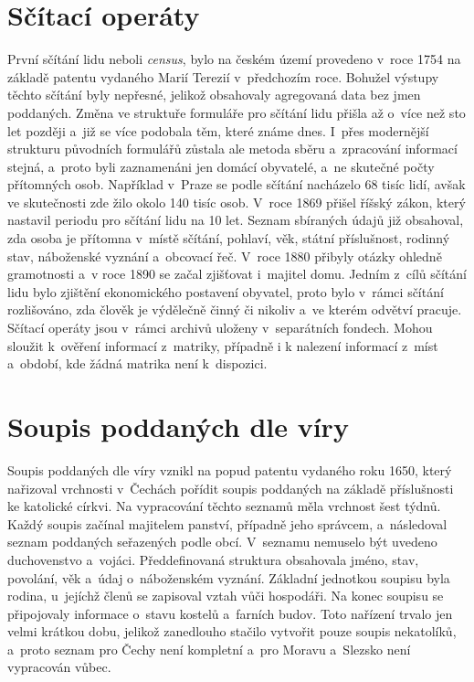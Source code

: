 \section{Sčítací operáty}
První sčítání lidu \cite{SestavteSiRodokmen, scitaciOperaty} neboli \textit{census}, bylo na českém území provedeno v~roce 1754 na základě patentu vydaného Marií Terezií v~předchozím roce. Bohužel výstupy těchto sčítání byly nepřesné, jelikož obsahovaly agregovaná data bez jmen poddaných. Změna ve struktuře formuláře pro sčítání lidu přišla až o~více než sto let později a~již se více podobala těm, které známe dnes. I~přes modernější strukturu původních formulářů zůstala ale metoda sběru a~zpracování informací stejná, a~proto byli zaznamenáni jen domácí obyvatelé, a~ne skutečné počty přítomných osob. Například v~Praze se podle sčítání nacházelo 68 tisíc lidí, avšak ve skutečnosti zde žilo okolo 140 tisíc osob. V~roce 1869 přišel říšský zákon, který nastavil periodu pro sčítání lidu na 10 let. Seznam sbíraných údajů již obsahoval, zda osoba je přítomna v~místě sčítání, pohlaví, věk, státní příslušnost, rodinný stav, náboženské vyznání a~obcovací řeč. V~roce 1880 přibyly otázky ohledně gramotnosti a~v roce 1890 se začal zjišťovat i~majitel domu. Jedním z~cílů sčítání lidu bylo zjištění ekonomického postavení obyvatel, proto bylo v~rámci sčítání rozlišováno, zda člověk je výdělečně činný či nikoliv a~ve kterém odvětví pracuje. Sčítací operáty jsou v~rámci archivů uloženy v~separátních fondech. Mohou sloužit k~ověření informací z~matriky, případně i k nalezení informací z~míst a~období, kde žádná matrika není k~dispozici.


\section{Soupis poddaných dle víry}
Soupis poddaných dle víry \cite{SoupisPoddanychDleViry} vznikl na popud patentu vydaného roku 1650, který nařizoval vrchnosti v~Čechách pořídit soupis poddaných na základě příslušnosti ke katolické církvi. Na vypracování těchto seznamů měla vrchnost šest týdnů. Každý soupis začínal majitelem panství, případně jeho správcem, a~následoval seznam poddaných seřazených podle obcí. V~seznamu nemuselo být uvedeno duchovenstvo a~vojáci. Předdefinovaná struktura obsahovala jméno, stav, povolání, věk a~údaj o~náboženském vyznání. Základní jednotkou soupisu byla rodina, u~jejíchž členů se zapisoval vztah vůči hospodáři. Na konec soupisu se připojovaly informace o~stavu kostelů a~farních budov. Toto nařízení trvalo jen velmi krátkou dobu, jelikož zanedlouho stačilo vytvořit pouze soupis nekatolíků, a~proto seznam pro Čechy není kompletní a~pro Moravu a~Slezsko není vypracován vůbec.

